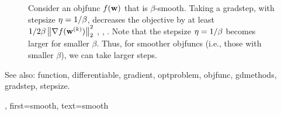 {{\begin{figure}[H]
\begin{center}
	    	\end{center}
	    	\caption{Consider an \gls{objfunc} $f({\bf w})$ that is $\beta$-smooth. 
	    		Taking a \gls{gradstep}, with \gls{stepsize} $\eta = 1/\beta$, decreases the 
	    		objective by at least ${1}/{2\beta}\left\Vert {\nabla f({\bf w}^{(k)})} \right\Vert_{2}^{2}$ \cite{nesterov04}, \cite{CvxBubeck2015}, \cite{CvxAlgBertsekas}. 
	    		Note that the \gls{stepsize} $\eta = 1/\beta$ becomes larger for smaller $\beta$. Thus, 
	    		for smoother \glspl{objfunc} (i.e., those with smaller $\beta$), 
				we can take larger steps. \label{fig_gd_smooth_dict}}
	    	\end{figure}
		See also: \gls{function}, \gls{differentiable}, \gls{gradient}, \gls{optproblem}, \gls{objfunc}, \gls{gdmethods}, \gls{gradstep}, \gls{stepsize}.},
	first={smooth},
	text={smooth}
}

